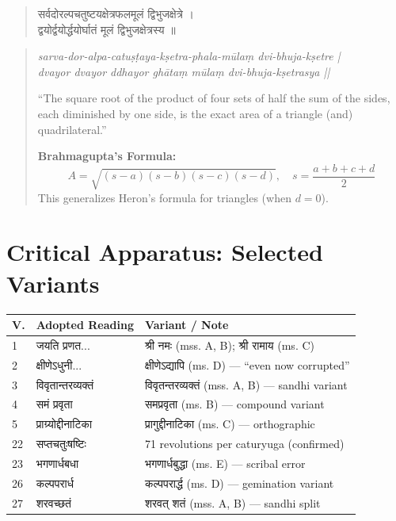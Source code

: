 \documentclass[11pt,a4paper]{article}
\newcommand{\dev}[1]{{\devanagarifont #1}}
\theoremstyle{definition}
\begin{document}
\vspace{0.3cm}



\noindent
\begin{quote}
\dev{सर्वदोरल्पचतुष्टयक्षेत्रफलमूलं द्विभुजक्षेत्रे ।\\
द्वयोर्द्वयोर्द्धयोर्घातं मूलं द्विभुजक्षेत्रस्य ॥}
\end{quote}

\hfill\noindent
\begin{quote}
\textit{sarva-dor-alpa-catu\d{s}\d{t}aya-k\d{s}etra-phala-m\=ula\d{m} dvi-bhuja-k\d{s}etre |\\
dvayor dvayor ddhayor gh\=ata\d{m} m\=ula\d{m} dvi-bhuja-k\d{s}etrasya ||}

``The square root of the product of four sets of half the sum of the sides, each diminished by one side, is the exact area of a triangle (and) quadrilateral.''

\textbf{Brahmagupta's Formula:}
\[
A = \sqrt{(s-a)(s-b)(s-c)(s-d)}, \quad s = \frac{a+b+c+d}{2}
\]
This generalizes Heron's formula for triangles (when $d = 0$).
\end{quote}



\vspace{0.8cm}

\section*{Critical Apparatus: Selected Variants}

\begin{longtable}{p{}p{}p{}}
\toprule
\textbf{V.} & \textbf{Adopted Reading} & \textbf{Variant / Note} \\
\midrule
\endhead
1 & \dev{जयति प्रणत...} & \dev{श्री नमः} (mss. A, B); \dev{श्री रामाय} (ms. C) \\
2 & \dev{क्षीणेऽधुनी...} & \dev{क्षीणेऽद्यापि} (ms. D) --- ``even now corrupted'' \\
3 & \dev{विवृतान्तरव्यक्तं} & \dev{विवृतन्तरव्यक्तं} (mss. A, B) --- sandhi variant \\
4 & \dev{समं प्रवृता} & \dev{समप्रवृता} (ms. B) --- compound variant \\
5 & \dev{प्राग्र्योद्दीनाटिका} & \dev{प्रागुद्दीनाटिका} (ms. C) --- orthographic \\
22 & \dev{सप्तचतुःषष्टिः} & 71 revolutions per caturyuga (confirmed) \\
23 & \dev{भगणार्धबधा} & \dev{भगणार्धबुद्धा} (ms. E) --- scribal error \\
26 & \dev{कल्पपरार्ध} & \dev{कल्पपरार्द्ध} (ms. D) --- gemination variant \\
27 & \dev{शरवच्छतं} & \dev{शरवत् शतं} (mss. A, B) --- sandhi split \\
\bottomrule
\end{longtable}
\end{document}
